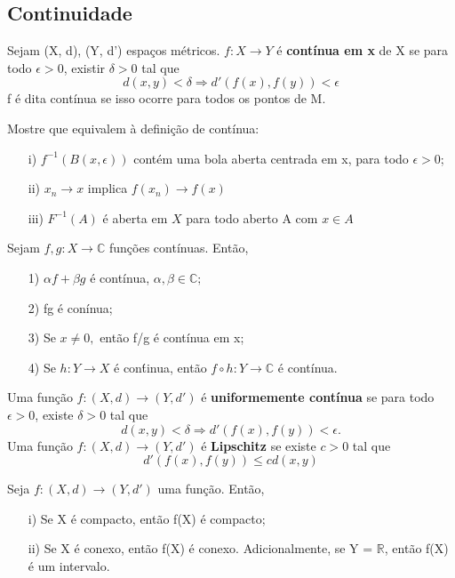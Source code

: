 \documentclass[ComplexAnalysis/complex.tex]{subfiles}
\begin{document}
\subsection{Continuidade}
\begin{def*}
	Sejam (X, d), (Y, d') espaços métricos. $f:X\rightarrow Y$ é \textbf{contínua em x} de X se para todo $\epsilon > 0$, existir
	$\delta > 0$ tal que
	$$
		d(x, y) < \delta\Rightarrow d'(f(x), f(y)) < \epsilon
	$$
	f é dita contínua se isso ocorre para todos os pontos de M.
\end{def*}
\begin{exer*}
	Mostre que equivalem à definição de contínua:
	\begin{itemize}
		\item[i)] $f^{-1}(B(x, \epsilon))$ contém uma bola aberta centrada em x, para todo $\epsilon > 0$;
		\item[ii)] $x_{n}\to{x}$ implica $f(x_{n})\to{f(x)}$
		\item[iii)] $F ^{-1}(A)$ é aberta em $X$ para todo aberto A com $x\in{A}$
	\end{itemize}
\end{exer*}
\begin{prop*}
	Sejam $f, g:X\rightarrow \mathbb{C}$ funções contínuas. Então,
	\begin{itemize}
		\item[1)] $\alpha f + \beta g$ é contínua, $\alpha, \beta\in \mathbb{C};$
		\item[2)] fg é conínua;
		\item[3)] Se $x\neq{0},$ então f/g é contínua em x;
		\item[4)] Se $h:Y\rightarrow X$ é con\'tinua, então $f\circ{h}:Y\rightarrow \mathbb{C}$ é contínua.
	\end{itemize}
\end{prop*}
\begin{def*}
	Uma função $f:(X, d)\rightarrow (Y, d')$ é \textbf{uniformemente contínua} se para todo $\epsilon > 0$, existe $\delta > 0$
	tal que
	$$
		d(x, y) < \delta\Rightarrow d'(f(x), f(y)) < \epsilon.
	$$
	Uma função $f:(X, d)\rightarrow (Y, d')$ é \textbf{Lipschitz} se existe $c > 0$ tal que
	$$
		d'(f(x), f(y)) \leq cd(x, y)
	$$
\end{def*}
\begin{theorem*}
	Seja $f:(X, d)\rightarrow (Y, d')$ uma função. Então,
	\begin{itemize}
		\item[i)] Se X é compacto, então f(X) é compacto;
		\item[ii)] Se X é conexo, então f(X) é conexo. Adicionalmente, se Y = $\mathbb{R}$, então f(X) é um intervalo.
	\end{itemize}
\end{theorem*}
\end{document}
